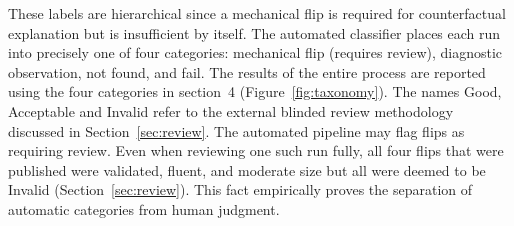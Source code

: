 \documentclass[11pt,a4paper]{article}
\begin{document}
These labels are hierarchical since a mechanical flip is required for counterfactual
explanation but is insufficient by itself. The automated classifier places each run
into precisely one of four categories: mechanical flip (requires review), diagnostic
observation, not found, and fail. The results of the entire process are reported using
the four categories in section~4 (Figure~\ref{fig:taxonomy}). The names Good,
Acceptable and Invalid refer to the external blinded review methodology discussed in
Section~\ref{sec:review}. The automated pipeline may flag flips as requiring review.
Even when reviewing one such run fully, all four flips that were published were
validated, fluent, and moderate size but all were deemed to be Invalid
(Section~\ref{sec:review}). This fact empirically proves the separation of automatic
categories from human judgment.
\end{document}
